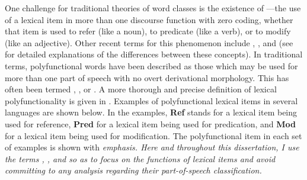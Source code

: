 One challenge for traditional theories of word classes is the existence of —the use of a lexical item in more than one discourse function with zero coding, whether that item is used to refer (like a noun), to predicate (like a verb), or to modify (like an adjective). Other recent terms for this phenomenon include , , and  (see  for detailed explanations of the differences between these concepts). In traditional terms, polyfunctional words have been described as those which may be used for more than one part of speech with no overt derivational morphology. This has often been termed , , or . A more thorough and precise definition of lexical polyfunctionality is given in . Examples of polyfunctional lexical items in several languages are shown below. In the examples, \textbf{Ref} stands for a lexical item being used for reference, \textbf{Pred} for a lexical item being used for predication, and \textbf{Mod} for a lexical item being used for modification. The polyfunctional item in each set of examples is shown with \em{emphasis}. Here and throughout this dissertation, I use the terms , , and  so as to focus on the functions of lexical items and avoid committing to any analysis regarding their part-of-speech classification.

\clearpage


